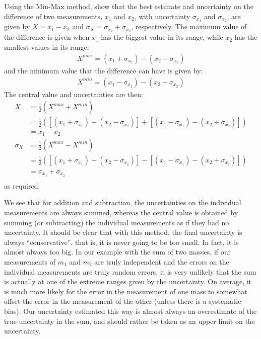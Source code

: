 \begin{example}{}{Using the Min-Max method, show that the best estimate and uncertainty on the difference of two measurements, $x_1$ and $x_2$, with uncertainty $\sigma_{x_1}$ and $\sigma_{x_2}$, are given by $X=x_1-x_2$ and $\sigma_{X} =\sigma_{x_2} + \sigma_{x_2}$, respectively.}{} 
The maximum value of the difference is given when $x_1$ has the biggest value in its range, while $x_2$ has the smallest values in its range:
\begin{align*}
X^{max}=(x_1+\sigma_{x_1})-(x_2-\sigma_{x_2})
\end{align*}
and the minimum value that the difference can have is given by:
\begin{align*}
X^{min}=(x_1-\sigma_{x_1})-(x_2+\sigma_{x_2})
\end{align*}
The central value and uncertainties are then:
\begin{align*}
X&=\frac{1}{2}(X^{max}+X^{min})\nonumber\\
 &=\frac{1}{2}\left(\left[(x_1+\sigma_{x_1})-(x_2-\sigma_{x_2})\right]+\left[(x_1-\sigma_{x_1})-(x_2+\sigma_{x_2})\right]\right)\nonumber\\
 &=x_1-x_2\nonumber\\
\sigma_{X} &=\frac{1}{2}(X^{max}-X^{min})\nonumber\\
 &=\frac{1}{2}\left(\left[(x_1+\sigma_{x_1})-(x_2-\sigma_{x_2})\right]-\left[(x_1-\sigma_{x_1})-(x_2+\sigma_{x_2})\right]\right)\nonumber\\
 &=\sigma_{x_1}+ \sigma_{x_2}\nonumber\\
\end{align*}
as required.
\end{example}
We see that for addition and subtraction, the uncertainties on the individual measurements are always summed, whereas the central value is obtained by summing (or subtracting) the individual measurements as if they had no uncertainty. It should be clear that with this method, the final uncertainty is always ``conservative'', that is, it is never going to be too small. In fact, it is almost always too big. In our example with the sum of two masses, if our measurements of $m_1$ and $m_2$ are truly independent and the errors on the individual measurements are truly random errors, it is very unlikely that the sum is actually at one of the extreme ranges given by the uncertainty. On average, it is much more likely for the error in the measurement of one mass to somewhat offset the error in the measurement of the other (unless there is a systematic bias). Our uncertainty estimated this way is almost always an overestimate of the true uncertainty in the sum, and should rather be taken as an upper limit on the uncertainty. 
